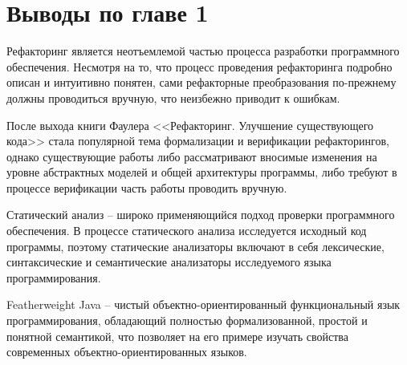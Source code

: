 \section*{Выводы по главе 1}
Рефакторинг является неотъемлемой частью процесса разработки программного обеспечения.
Несмотря на то, что процесс проведения рефакторинга подробно описан и интуитивно понятен,
сами рефакторные преобразования по-прежнему должны проводиться вручную, что неизбежно приводит к ошибкам.

После выхода книги Фаулера <<Рефакторинг. Улучшение существующего кода>> стала популярной тема формализации и верификации рефакторингов,
однако существующие работы либо рассматривают вносимые изменения на уровне абстрактных моделей и общей архитектуры программы,
либо требуют в процессе верификации часть работы проводить вручную.

Статический анализ -- широко применяющийся подход проверки программного обеспечения.
В процессе статического анализа исследуется исходный код программы,
поэтому статические анализаторы включают в себя лексические, синтаксические и семантические анализаторы исследуемого языка программирования.

Featherweight Java -- чистый объектно-ориентированный функциональный язык программирования,
обладающий полностью формализованной, простой и понятной семантикой, что позволяет на его примере изучать свойства современных объектно-ориентированных языков.